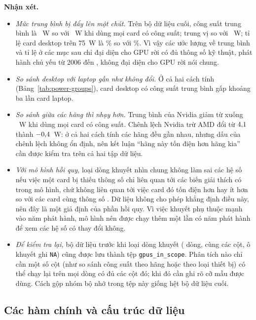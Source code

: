 \textbf{Nhận xét.}
\begin{itemize}
  \item \emph{Mức trung bình bị đẩy lên một chút.} Trên bộ dữ liệu cuối, công suất trung
    bình là \PreFinalPowerMean~W so với \PreAllPowerMean~W khi dùng mọi card có công suất;
    trung vị \PreFinalPowerMedian{} so với \PreAllPowerMedian~W; tỉ lệ card desktop trên
    75~W là \PreFinalDesktopAuxPct\% so với \PreAllDesktopAuxPct\%. Vì vậy các ước lượng về
    trung bình và tỉ lệ ở các mục sau chỉ đại diện cho GPU rời có đủ thông số kỹ thuật,
    phát hành chủ yếu từ 2006 đến \PreReleaseYearMax, không đại diện cho GPU rời nói chung.
  \item \emph{So sánh desktop với laptop gần như không đổi.} Ở cả hai cách tính
    (Bảng~\ref{tab:power-groups}), card desktop có công suất trung bình gấp khoảng ba lần
    card laptop.
  \item \emph{So sánh giữa các hãng thì nhạy hơn.} Trung bình của Nvidia giảm từ
    \PreNvidiaFinalMean{} xuống \PreNvidiaAllMean~W khi dùng mọi card có công suất. Chênh
    lệch Nvidia trừ AMD đổi từ $4{,}1$ thành $-0{,}4$~W:
    ở cả hai cách tính các hãng đều gần nhau, nhưng dấu của chênh lệch không ổn định, nên
    kết luận ``hãng này tốn điện hơn hãng kia'' cần được kiểm tra trên cả hai tập dữ liệu.
  \item \emph{Với mô hình hồi quy,} loại dòng khuyết nhìn chung không làm sai các hệ số
    nếu việc một card bị thiếu thông số chỉ liên quan tới các biến giải thích có trong mô
    hình, chứ không liên quan tới việc card đó tốn điện hơn hay ít hơn so với các card cùng
    thông số \cite{hughes2019}. Dữ
    liệu không cho phép khẳng định điều này, nên đây là một giả định của phần hồi quy. Vì
    việc khuyết phụ thuộc mạnh vào năm phát hành, mô hình nên được chạy thêm một lần có năm
    phát hành để xem các hệ số có thay đổi không.
  \item \emph{Để kiểm tra lại,} bộ dữ liệu trước khi loại dòng khuyết (\PreRowsScoped{}
    dòng, cùng các cột, ô khuyết ghi \texttt{NA}) cũng được lưu thành tệp
    \texttt{gpus\_in\_scope}. Phân tích nào chỉ cần một số cột (như so sánh công suất theo
    hãng hoặc theo loại thiết bị) có thể chạy lại trên mọi dòng có đủ các cột đó; khi đó
    cần ghi rõ cỡ mẫu được dùng. Cách gộp nhóm bộ nhớ trong tệp này giống hệt bộ dữ liệu
    cuối.
\end{itemize}

\subsection{Các hàm chính và cấu trúc dữ liệu}

